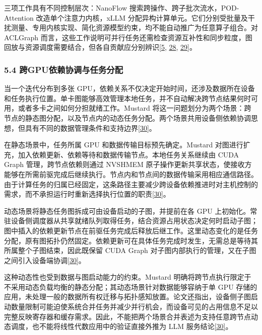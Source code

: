 \documentclass[UTF8,11pt,fontset=windows]{ctexart}
\begin{document}
三项工作具有不同控制层次：NanoFlow 搜索跨操作、跨子批次流水，POD-Attention 改造单个注意力内核，xLLM 分配异构计算单元。它们分别受批量及干扰测量、专用内核实现、简化资源模型约束，均不能自动推广为任意算子组合。对 ACLGraph 而言，这些工作说明可并行任务还需检查资源互补性和同步粒度，图回放与资源调度需要结合，但各自贡献应分别辨识\protect\hyperlink{ref-5}{{[}5}, \protect\hyperlink{ref-28}{28}, \protect\hyperlink{ref-29}{29{]}}。

\hypertarget{section-5-4}{%
\subsubsection{\texorpdfstring{\textbf{5.4 跨GPU依赖协调与任务分配}}{5.4 跨GPU依赖协调与任务分配}}\label{section-5-4}}

当一个迭代分布到多张 GPU，依赖关系不仅决定开始时间，还涉及数据所在设备和任务执行位置。单卡图能够高效管理本地任务，并不自动解决跨节点结果何时可用，或者多卡之间如何分担就绪工作。Mustard 将这一问题划分为两个场景：跨节点的静态图分配，以及节点内的动态任务分配。两个场景共用设备侧依赖协调思想，但具有不同的数据管理条件和支持边界\protect\hyperlink{ref-30}{{[}30{]}}。

在静态场景中，任务所属 GPU 和数据传输目标预先确定。Mustard 对图进行扩充，加入依赖更新、依赖等待和数据传输节点。本地任务关系继续由 CUDA Graph 管理，跨节点依赖则通过 NVSHMEM 原子操作更新共享状态，使接收方能够在所需前驱完成后继续执行。节点内和节点间的数据传输采用相应通信路径。由于计算任务的归属已经固定，这条路径主要减少跨设备依赖推进时对主机控制的需求，而不承担运行时重新选择执行位置的职责\protect\hyperlink{ref-30}{{[}30{]}}。

动态场景将静态任务图拆成可由设备启动的子图，并提前在各 GPU 上初始化。常驻设备侧调度器从共享就绪队列取得任务，结合资源占用状态决定何时启动子图；图中插入的依赖更新节点在前驱任务完成后释放后继工作。这里动态变化的是任务分配，原有图拓扑仍然固定。依赖更新可在具体任务完成时发生，无需总是等待其所属整个子图结束，因此既保留 CUDA Graph 对子图内部执行的管理，又在子图之间引入设备端协调\protect\hyperlink{ref-30}{{[}30{]}}。

这种动态性也受到数据与图启动能力的约束。Mustard 明确将跨节点执行限定于不采用动态负载均衡的静态分配；其动态场景针对数据能够容纳于单 GPU 存储的应用，未处理一般的数据所有权迁移与拓扑感知放置。论文还指出，设备侧子图启动数量限制可能迫使系统合并任务并减少并行机会，而设备可见的占用信息不足以完整反映寄存器和缓存需求。因此，不能把两个场景合并表述为支持任意跨节点动态调度，也不能将线性代数应用中的验证直接外推为 LLM 服务结论\protect\hyperlink{ref-30}{{[}30{]}}。
\end{document}
